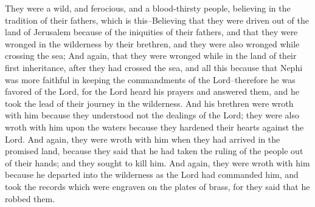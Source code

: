 \bverse \iffalse They were a wild, and ferocious, and a blood-thirsty people, believing in the tradition of their fathers, which is this--Believing that they were driven out of the land of Jerusalem because of the iniquities of their fathers, and that they were wronged in the wilderness by their brethren, and they were also wronged while crossing the sea; \fi
They were a wild, and ferocious, and a blood-thirsty people, believing in the tradition of their fathers, which is this--Believing that they were driven out of the land of Jerusalem because of the iniquities of their fathers, and that they were wronged in the wilderness by their brethren, and they were also wronged while crossing the sea;
\bverse \iffalse And again, that they were wronged while in the land of their first inheritance, after they had crossed the sea, and all this because that Nephi was more faithful in keeping the commandments of the Lord--therefore he was favored of the Lord, for the Lord heard his prayers and answered them, and he took the lead of their journey in the wilderness. \fi
And again, that they were wronged while in the land of their first inheritance, after they had crossed the sea, and all this because that Nephi was more faithful in keeping the commandments of the Lord--therefore he was favored of the Lord, for the Lord heard his prayers and answered them, and he took the lead of their journey in the wilderness.
\bverse \iffalse And his brethren were wroth with him because they understood not the dealings of the Lord; they were also wroth with him upon the waters because they hardened their hearts against the Lord. \fi
And his brethren were wroth with him because they understood not the dealings of the Lord; they were also wroth with him upon the waters because they hardened their hearts against the Lord.
\bverse \iffalse And again, they were wroth with him when they had arrived in the promised land, because they said that he had taken the ruling of the people out of their hands; and they sought to kill him. \fi
And again, they were wroth with him when they had arrived in the promised land, because they said that he had taken the ruling of the people out of their hands; and they sought to kill him.
\bverse \iffalse And again, they were wroth with him because he departed into the wilderness as the Lord had commanded him, and took the records which were engraven on the plates of brass, for they said that he robbed them. \fi
And again, they were wroth with him because he departed into the wilderness as the Lord had commanded him, and took the records which were engraven on the plates of brass, for they said that he robbed them.
